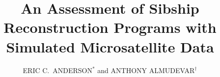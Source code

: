 

\newcommand{\myTitle}{An Assessment of Sibship Reconstruction Programs with Simulated Microsatellite Data}
\title{\myTitle}


\newcommand{\myAuthors}{ERIC C.~ANDERSON$^*$ and ANTHONY ALMUDEVAR$^\dagger$} 
\author{\myAuthors}


\newcommand{\myAffiliations}{
$^*${\em Fisheries Ecology Division, Southwest Fisheries Science Center, Santa Cruz, CA}.
$^\dagger${\em Department of Biostatistics and Computational Biology,
University of Rochester Medical School, Rochester, NY}
}
\renewcommand{\AuthorAddresses}{\myAffiliations}


\renewcommand{\KeyWords}{Pedigree Reconstruction, Sibling Group Inference}

\renewcommand{\CorrespondingAuthor}{Eric C. Anderson, Fisheries Ecology Division, Southwest Fisheries Science
Center, 110 Shaffer Road, Santa Cruz, CA 95060. eric.anderson@noaa.gov}


\renewcommand{\RunningTitle}{Sibship Inference Comparison}

\newcommand{\myEmailAddress}{eric.anderson@noaa.gov}
\newcommand{\myEmailFootnote}{$^\S$}

\newcommand{\myCopyright}{\copyright US Federal Government work in the public domain in the USA}

\newcommand{\myRunningTitle}{\RunningTitle}

\newcommand{\myRunningAuthor}{Anderson \& Almudevar}
